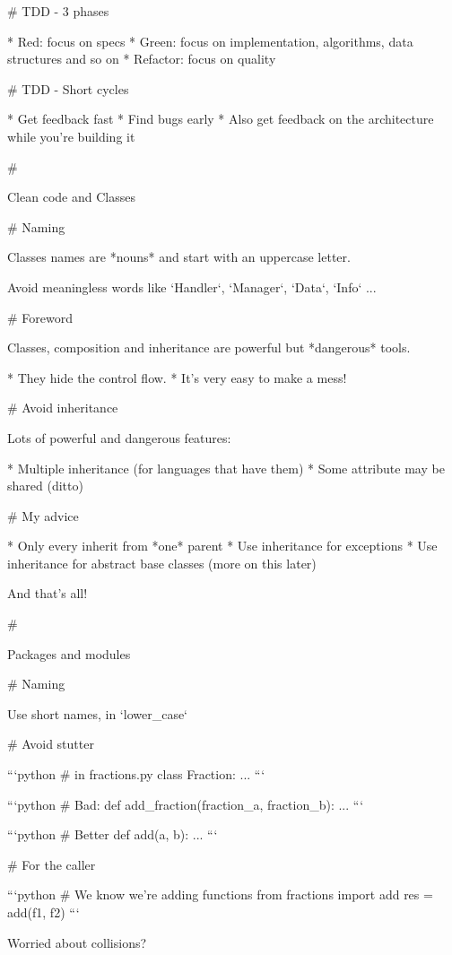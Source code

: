 # TDD - 3 phases

* Red: focus on specs
* Green: focus on implementation, algorithms, data structures and so on
* Refactor: focus on quality

# TDD - Short cycles

 * Get feedback fast
 * Find bugs early
 * Also get feedback on the architecture while you're building it


#

\huge \center Clean code and Classes

# Naming

Classes names are *nouns* and start with an uppercase letter.

Avoid meaningless words like `Handler`, `Manager`, `Data`, `Info` ...

# Foreword

Classes, composition and inheritance are powerful but *dangerous* tools.

* They hide the control flow.
* It's very easy to make a mess!

# Avoid inheritance

Lots of powerful and dangerous features:

* Multiple inheritance (for languages that have them)
* Some attribute may be shared (ditto)

#  My advice

* Only every inherit from *one* parent
* Use inheritance for exceptions
* Use inheritance for abstract base classes (more on this later)

\vfill

And that's all!

#

\huge \center Packages and modules

# Naming

Use short names, in `lower_case`


# Avoid stutter

```python
# in fractions.py
class Fraction:
    ...
```

```python
# Bad:
def add_fraction(fraction_a, fraction_b):
    ...
```

```python
# Better
def add(a, b):
    ...
```

# For the caller

```python
# We know we're adding functions
from fractions import add
res = add(f1, f2)
```

\vfill

Worried about collisions?

